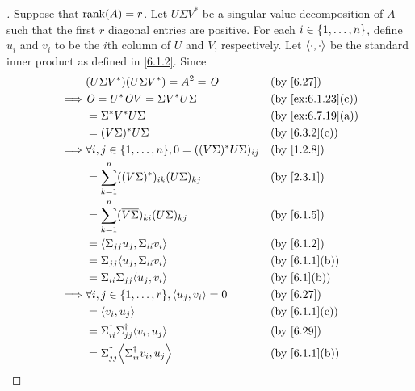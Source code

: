 \begin{proof}[]
  Suppose that \(\rk{A} = r\).
  Let \(U \Sigma V^*\) be a singular value decomposition of \(A\) such that the first \(r\) diagonal entries are positive.
  For each \(i \in \left\lbrace1, \dots, n\right\rbrace\), define \(u_i\) and \(v_i\) to be the \(i\)th column of \(U\) and \(V\), respectively.
  Let \(\left\langle\cdot, \cdot\right\rangle\) be the standard inner product as defined in \cref{6.1.2}.
  Since
  \begin{align*}
             & (U \Sigma V^*) (U \Sigma V^*) = A^2 = \zm                               &  & \by{6.27}         \\
    \implies & \zm = U^* \zm V = \Sigma V^* U \Sigma                                   &  & \by{ex:6.1.23}[c] \\
             & = \Sigma^* V^* U \Sigma                                                 &  & \by{ex:6.7.19}[a] \\
             & = (V \Sigma)^* U \Sigma                                                 &  & \by{6.3.2}[c]     \\
    \implies & \forall i, j \in \set{1, \dots, n}, 0 = ((V \Sigma)^* U \Sigma)_{i j}   &  & \by{1.2.8}        \\
             & = \sum_{k = 1}^n ((V \Sigma)^*)_{i k} (U \Sigma)_{k j}                  &  & \by{2.3.1}        \\
             & = \sum_{k = 1}^n (\conj{V \Sigma})_{k i} (U \Sigma)_{k j}               &  & \by{6.1.5}        \\
             & = \inn{\Sigma_{j j} u_j, \Sigma_{i i} v_i}                              &  & \by{6.1.2}        \\
             & = \Sigma_{j j} \inn{u_j, \Sigma_{i i} v_i}                              &  & \by{6.1.1}[b]     \\
             & = \Sigma_{i i} \Sigma_{j j} \inn{u_j, v_i}                              &  & \by{6.1}[b]       \\
    \implies & \forall i, j \in \set{1, \dots, r}, \inn{u_j, v_i} = 0                  &  & \by{6.27}         \\
             & = \inn{v_i, u_j}                                                        &  & \by{6.1.1}[c]     \\
             & = \Sigma_{i i}^{\dag} \Sigma_{j j}^{\dag} \inn{v_i, u_j}                &  & \by{6.29}         \\
             & = \Sigma_{j j}^{\dag} \inn{\Sigma_{i i}^{\dag} v_i, u_j}                &  & \by{6.1.1}[b]     \\

\end{align*}
\end{proof}
